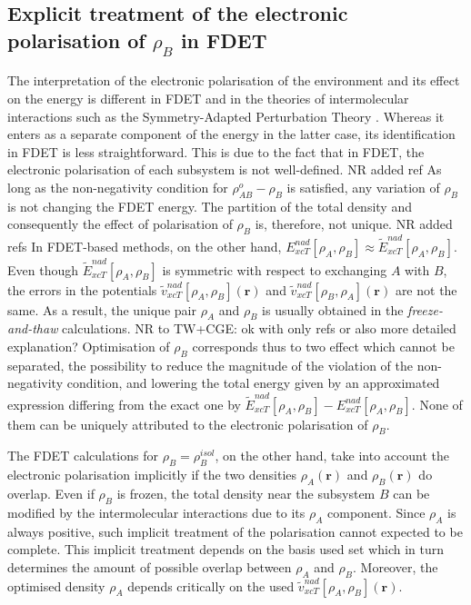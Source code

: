 \documentclass[journal=jctcce,manuscript=article]{achemso}
\newcommand{\nr}[1]{\color{red}#1\color{black}}
\begin{document}
\subsection{Explicit treatment of the electronic polarisation of $\rho_B$ in FDET}\label{sect:pol_treat}
The interpretation of the electronic polarisation of the environment and its effect on the energy is different in FDET and in the theories of intermolecular interactions such as the Symmetry-Adapted Perturbation Theory \cite{Jeziorski1994}. Whereas it enters as a separate component of the energy in the latter case, its identification in FDET is less straightforward.
\nr{This is due to } the fact that in FDET, the electronic polarisation of each subsystem is not well-defined.\cite{HumbertDroz2014} \nr{NR added ref } As long as the non-negativity condition for $\rho^{o}_{AB}-\rho_B$ is satisfied, any \nr{variation } of $\rho_B$ is not changing the FDET energy. The partition of the total density and consequently the effect of polarisation of $\rho_B$ is, therefore, not unique.\cite{Wesolowski2013,Savin2009}  \nr{NR added refs }
In FDET\nr{-}based methods, on the other hand,  ${E}_{xcT}^{nad}[\rho_A,\rho_B]\approx \tilde{E}_{xcT}^{nad}[\rho_A,\rho_B]$. 
Even though $\tilde{E}_{xcT}^{nad}[\rho_A,\rho_B]$
is symmetric with respect to exchanging $A$ with $B$, 
the errors in the potentials  $\tilde{v}_{xcT}^{nad}[\rho_A,\rho_B](\mathbf{r})$ and  $\tilde{v}_{xcT}^{nad}[\rho_B,\rho_A](\mathbf{r})$
 are not the same. 
As a result, the unique pair $\rho_A$ and  $\rho_B$ is usually obtained in the \textit{freeze-and-thaw} calculations.\cite{Wesolowski2015,Wesolowski1997a,Dulak2007a} 
\nr{NR to TW+CGE: ok with only refs or also more detailed explanation? } 
Optimisation of $\rho_B$  corresponds thus to two effect which cannot be separated, the possibility to reduce the magnitude of the violation of the non-negativity condition, and lowering the total energy given by an approximated expression differing from the exact one by  $\tilde{E}_{xcT}^{nad}[\rho_A,\rho_B]-{E}_{xcT}^{nad}[\rho_A,\rho_B]$. None of them can be uniquely attributed to the electronic polarisation of $\rho_B$. 

The FDET calculations for $\rho_B=\rho_B^{isol}$, on the other hand, take into account the electronic polarisation implicitly if the two densities $\rho_A(\mathbf{r})$ and $\rho_B(\mathbf{r})$ do overlap. 
Even if $\rho_B$ is frozen, the total density near the subsystem $B$ can be modified by the intermolecular interactions due to its $\rho_A$ component.  Since $\rho_A$
is always positive, such implicit treatment of the polarisation cannot expected to be complete. 
This implicit treatment depends on the basis \nr{used } set which \nr{in turn } determines the amount of possible overlap between  $\rho_A$ and $\rho_B$.
Moreover, the optimised density 
$\rho_A$ depends critically on the used $\tilde{v}_{xcT}^{nad}[\rho_A,\rho_B](\mathbf{r})$.  
\end{document}
